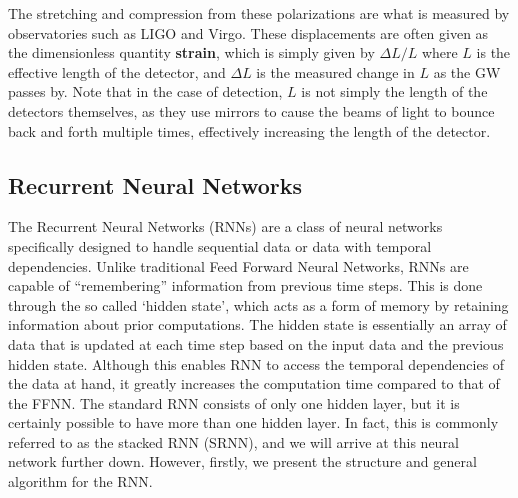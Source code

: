 \documentclass[%
reprint,
amsmath,amssymb,
aps,
]{revtex4-2}
\begin{document}
The stretching and compression from these polarizations are what is measured by observatories such as LIGO and Virgo. These displacements are often given as the dimensionless quantity \textbf{strain}, which is simply given by $\Delta L/L$ where $L$ is the effective length of the detector, and $\Delta L$ is the measured change in $L$ as the GW passes by. Note that in the case of detection, $L$ is not simply the length of the detectors themselves, as they use mirrors to cause the beams of light to bounce back and forth multiple times, effectively increasing the length of the detector.


\subsection{Recurrent Neural Networks} \label{sec:RNNs}
The Recurrent Neural Networks (RNNs) are a class of neural networks specifically designed to handle sequential data or data with temporal dependencies. Unlike traditional Feed Forward Neural Networks, RNNs are capable of ``remembering'' information from previous time steps. This is done through the so called `hidden state', which acts as a form of memory by retaining information about prior computations. The hidden state is essentially an array of data that is updated at each time step based on the input data and the previous hidden state. Although this enables RNN to access the temporal dependencies of the data at hand, it greatly increases the computation time compared to that of the FFNN. The standard RNN consists of only one hidden layer, but it is certainly possible to have more than one hidden layer. In fact, this is commonly referred to as the stacked RNN (SRNN), and we will arrive at this neural network further down. However, firstly, we present the structure and general algorithm for the RNN.
\end{document}
